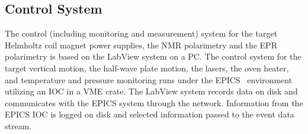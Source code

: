 \subsection{Control System}

The control (including monitoring and measurement) system for
the target Helmholtz coil magnet power supplies, the NMR polarimetry
and the EPR polarimetry is based on the LabView system on a PC.
The control system for the target vertical motion, the half-wave
plate motion, the lasers,
the oven heater, and temperature and pressure monitoring
runs under the EPICS~\cite{EPICSwww} environment utilizing
 an IOC in a VME crate. The LabView system 
records data on disk and communicates with the 
EPICS system through the network. Information from the EPICS IOC is logged 
on disk and selected information passed to the event data stream.

